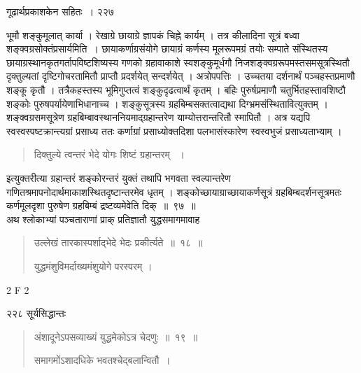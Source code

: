 \documentclass[11pt, openany]{book}
\begin{document}
\newpage

 \hspace{3cm} गूढार्थप्रकाशकेन सहितः~। \hfill २२७
\vspace{1cm}


\noindent भूमौ शङ्कुमूलात् कार्या । रेखाग्रे छायाग्रे ज्ञापकं चिह्ने कार्यम् । तत्र कीलादिना सूत्रं बध्वा शङ्क्वग्रसोक्तं\textendash प्रसार्यमिति~। छायाकर्णाग्रसंयोगे छायाग्रं कर्णस्य मूलरूपमग्रं तयोः सम्पाते संस्थितस्य छायाग्रस्थानकृतगर्तापविष्टशिष्यस्य गणको ग्रहावाकाशे स्वशङ्कुमूर्धगौ निजशङ्क्वग्ररूपमस्तसमसूत्रस्थितौ दृक्तुल्यतां दृष्टिगोचरतामितौ प्राप्तौ प्रदर्शयेत् सन्दर्शयेत् । अत्रोपपत्तिः । उच्चतया दर्शनार्थं पञ्चहस्तप्रमाणौ शङ्कू कृतौ । तत्रैकहस्तस्य भूमिगुप्तत्वं शङ्कुदृढत्वार्थं कृतम् । बहिः पुरुर्षप्रमाणौ चतुर्भितहस्तावशिष्टौ शङ्कोः पुरुषपर्यायेणाभिधानाच्च । शङ्कुसूत्रस्य ग्रहबिम्बसक्तत्वाद्यथा दिग्भ्रमसंस्थितावित्युक्तम् । शङ्क्वग्रसमसूत्रेण ग्रहबिम्बावस्थाननियमाद्ग्रहान्तरेण याम्योत्तरान्तरितौ स्मापितौ । अत्र यद्यपि स्वस्वस्पष्टक्रान्त्यग्रां प्रसाध्य ततः कर्णाग्रां प्रसाध्योक्तदिशा पलभासंस्कारेण स्वस्वभुजं प्रसाध्यताभ्याम् । 


\begin{quote}
{\ssi दिक्तुल्ये त्वन्तरं भेदे योगः शिष्टं ग्रहान्तरम् ~। }
\end{quote}
 

इत्युक्तरीत्या ग्रहान्तरं शङ्कोरन्तरं युक्तं तथापि भगवता स्वल्पान्तरेण गणितश्रमापनोदार्थमाकाशस्थितदृष्टान्तरमेव धृतम् । शङ्कोच्छायाग्राच्छायाकर्णसूत्रं ग्रहबिम्बदर्शनसूत्रमतः कर्णमूलदृशा पुरुषेण ग्रहबिम्बं द्रष्टव्यमेवेति दिक्~॥~९७~॥\\
\noindent अथ श्लोकाभ्यां पञ्चताराणां प्राक् प्रतिज्ञातौ युद्धसमागमावाह \textendash


 \begin{quote}
{\ssi उल्लेखं तारकास्पर्शाद्भेदे भेदः प्रकीर्त्यते~॥~१८~॥
 
 युद्धमंशुविमर्दाख्यमंशुयोगे परस्परम् ।}
\end{quote}

{\tiny{2 F 2}}


\newpage

\noindent २२८ \hspace{4cm} सूर्यसिद्धान्तः 
\vspace{1cm}

\begin{quote}
{\ssi अंशादूनेऽपसव्याख्यं युद्धमेकोऽत्र चेदणुः~॥~१९~॥
 
समागमोंऽशादधिके भवतश्चेद्बलान्वितौ~।}
\end{quote}
\end{document}
